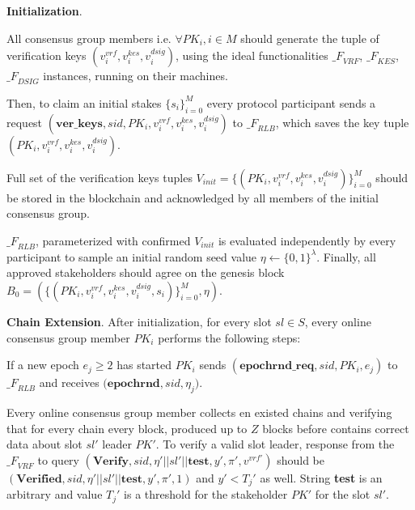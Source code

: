 \begin{legal}
    \item \textbf{Initialization}.
    \begin{legal}
        \item All consensus group members i.e. $\forall PK_i, i \in M$ should generate the tuple of verification keys ${(v_i^{vrf}, v_i^{kes}, v_i^{dsig})}$, using the ideal functionalities ${\mathcal_{F}}_{VRF}$, ${\mathcal_{F}}_{KES}$, ${\mathcal_{F}}_{DSIG}$ instances, running on their machines.
        \item Then, to claim an initial stakes $\{s_i\}_{i=0}^M$ every protocol participant sends a request ${(\textbf{ver\_keys}, sid, PK_i, v_i^{vrf}, v_i^{kes}, v_i^{dsig})}$ to ${\mathcal_{F}}_{RLB}$, which saves the key tuple ${(PK_i, v_i^{vrf}, v_i^{kes}, v_i^{dsig})}$.
        \item Full set of the verification keys tuples ${V_{init} = \{(PK_i, v_i^{vrf}, v_i^{kes}, v_i^{dsig})\}_{i=0}^M}$ should be stored in the blockchain and acknowledged by all members of the initial consensus group.
        \item ${\mathcal_{F}}_{RLB}$, parameterized with confirmed $V_{init}$ is evaluated independently by every participant to sample an initial random seed value $\eta \leftarrow \{0, 1\}^\lambda$.
        Finally, all approved stakeholders should agree on the genesis block ${B_0=\left(\{(PK_i, v_i^{vrf}, v_i^{kes}, v_i^{dsig}, s_i)\}_{i=0}^M, \eta\right)}$.
    \end{legal}
    \item \textbf{Chain Extension}.
    After initialization, for every slot $sl \in S$, every online consensus group member $PK_i$ performs the following steps:
    \begin{legal}
        \item If a new epoch ${e_j \geqslant 2}$ has started $PK_i$ sends ${(\textbf{epochrnd\_req}, sid, PK_i, e_j)}$ to ${\mathcal_{F}}_{RLB}$ and receives $({\textbf{epochrnd}, sid, \eta_j)}$.

        \item Every online consensus group member collects en existed chains and verifying that for every chain every block, produced up to $Z$ blocks before contains correct data about slot $sl'$ leader $PK'$.
        To verify a valid slot leader, response from the ${\mathcal_{F}}_{VRF}$ to query ${(\textbf{Verify}, sid, \eta' || sl' || \textbf{test}, y', \pi', v^{vrf'})}$ should be ${(\textbf{Verified}, sid, \eta' || sl' || \textbf{test}, y', \pi', 1)}$ and $y'<T_j'$ as well.
        String \textbf{test} is an arbitrary and value $T_j'$ is a threshold for the stakeholder $PK'$ for the slot $sl'$.


\end{legal}
\end{legal}
